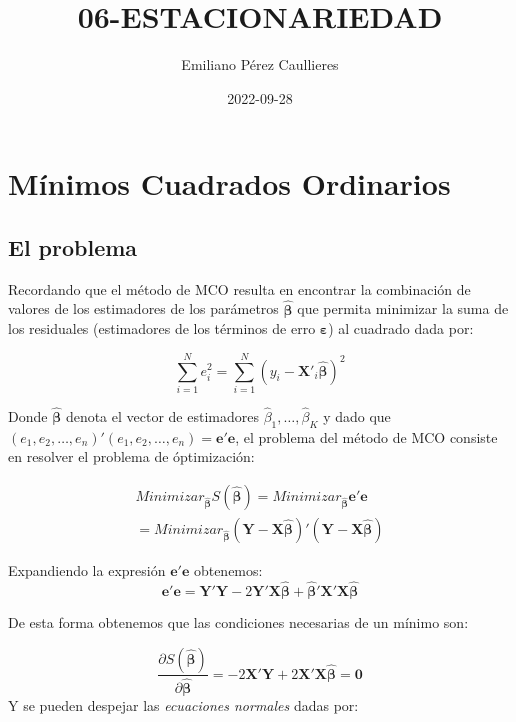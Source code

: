 \documentclass[
]{book}
\title{06-ESTACIONARIEDAD}
\author{Emiliano Pérez Caullieres}
\date{2022-09-28}
\begin{document}
\maketitle

{
\setcounter{tocdepth}{1}
\tableofcontents
}
\hypertarget{muxednimos-cuadrados-ordinarios}{%
\chapter{Mínimos Cuadrados Ordinarios}\label{muxednimos-cuadrados-ordinarios}}

\hypertarget{el-problema}{%
\section{El problema}\label{el-problema}}

Recordando que el método de MCO resulta en encontrar la combinación de valores de los estimadores de los parámetros \(\hat{\boldsymbol{\beta}}\) que permita minimizar la suma de los residuales (estimadores de los términos de erro \(\boldsymbol{\varepsilon}\)) al cuadrado dada por:

\[
    \sum^{N}_{i=1}{e^2_i} = \sum^{N}_{i = 1}{(y_i - \mathbf{X}'_i \hat{\boldsymbol{\beta}})^2}
\]

Donde \(\hat{\boldsymbol{\beta}}\) denota el vector de estimadores \(\hat{\beta}_1, \ldots, \hat{\beta}_K\) y dado que \((e_1, e_2, \ldots, e_n)'(e_1, e_2, \ldots, e_n) = {\mathbf{e'e}}\), el problema del método de MCO consiste en resolver el problema de óptimización:

\begin{eqnarray*}
Minimizar_{\hat{\boldsymbol \beta}} S(\hat{\boldsymbol \beta})  =  Minimizar_{\hat{\boldsymbol \beta}} \mathbf{e'e} \\
    =  Minimizar_{\hat{\boldsymbol \beta}} (\mathbf{Y}-\mathbf{X}\hat{\boldsymbol \beta})'(\mathbf{Y}-\mathbf{X}\hat{\boldsymbol \beta})
\end{eqnarray*}

Expandiendo la expresión \(\mathbf{e'e}\) obtenemos:
\[
    \mathbf{e'e} = \mathbf{Y'Y} - 2 \mathbf{Y'X} \hat{\boldsymbol \beta} + \hat{\boldsymbol \beta}' \mathbf{X'X}\hat{\boldsymbol \beta}
\]

De esta forma obtenemos que las condiciones necesarias de un mínimo son:

\[
    \frac{\partial S(\hat{\boldsymbol \beta})}{\partial \hat{\boldsymbol \beta}} = -2{\mathbf{X'Y}} + 2{\mathbf{X'X}} \hat{\boldsymbol{\beta}} = \mathbf{0}
\]
Y se pueden despejar las \textit{ecuaciones normales} dadas por:
\end{document}
